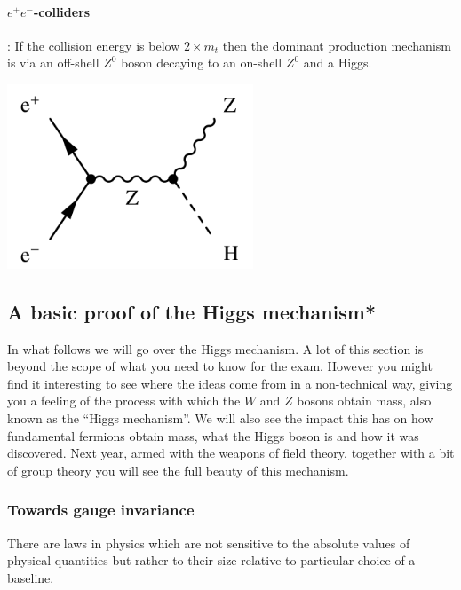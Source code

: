 \paragraph{$e^+e^-$-colliders}:
If the collision energy is below $2\times m_{t}$ then the dominant production mechanism is via an off-shell $Z^0$ boson decaying to an on-shell $Z^0$ and a Higgs.
\begin{center}
\includegraphics[width=0.55\textwidth]{fig/higgs/higgs_strahlung.png}
\end{center}

\subsection{A basic proof of the Higgs mechanism*}
In what follows we will go over the Higgs mechanism. A lot of this section is beyond the scope of what
you need to know for the exam. However you might find it interesting to see where the ideas come from
in a non-technical way, giving you a feeling of the 
process with which the $W$ and $Z$ bosons obtain mass, also known as the ``Higgs mechanism''. We will also see the impact this has on how fundamental fermions obtain mass, what the Higgs boson is and how it was discovered. Next year, armed with the weapons of field theory, together with a bit of group theory you will see the full beauty of this mechanism.

\subsubsection{Towards gauge invariance}

There are laws in physics which are not sensitive
to the absolute values of physical quantities but rather to their size relative to particular choice of a baseline. 

